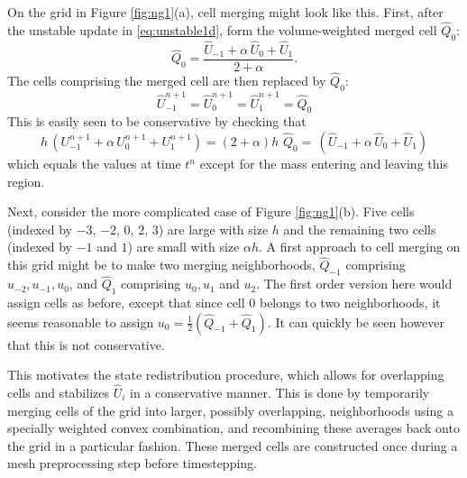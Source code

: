 On the grid in Figure \ref{fig:ng1}(a), cell merging might look like this.
First, after the unstable update in \eqref{eq:unstable1d}, form the 
volume-weighted merged cell $\widehat{Q}_0$:
\begin{equation}
\widehat{Q}_0 = \frac{\widehat{U}_{-1} + \alpha \,  \widehat{U}_0 + 
\widehat{U}_1}{2+\alpha} .
\end{equation}
The cells comprising the merged cell
are then replaced by $\widehat{Q}_0$:
\begin{equation}
\widehat{U}_{-1}^{n+1} = \widehat{U}_0^{n+1} = \widehat{U}_1^{n+1} =
\widehat{Q}_0
\end{equation}
This is easily seen to be conservative by checking that
\begin{equation}
h \, (U_{-1}^{n+1} + \alpha \, U_0^{n+1} + U_1^{n+1})
= (2+\alpha) h \,  \, \widehat{Q}_0 =
 \, (\widehat{U}_{-1} + \alpha \, \widehat{U}_{0} +  \widehat{U}_{1})
\end{equation}
which equals the values at time $t^n$  except for the mass entering and
leaving this region.


Next, consider the more complicated case of Figure \ref{fig:ng1}(b).
Five cells (indexed by $-3$, $-2$, $0$, $2$, $3$) are large 
with size $h$ and the remaining two cells (indexed by $-1$ and $1$) 
are small with size $\alpha h$.
A first approach to cell merging on this grid
might be to make two merging neighborhoods, $\widehat{Q}_{-1}$
comprising $u_{-2},u_{-1},u_0$, and $\widehat{Q}_1$ comprising $u_0, u_1$ 
and $u_2$.
The first order version here would assign cells as before, except that
since cell 0 belongs to two neighborhoods, it seems  reasonable
to assign $u_0 = \frac{1}{2} (\widehat{Q}_{-1} + \widehat{Q}_1).$  
It can quickly be  seen however
that this is not conservative. 

This motivates the state redistribution
procedure, which allows for overlapping cells and stabilizes 
$\widehat{U}_i$ in a conservative manner.
This is done by temporarily merging cells of the grid into 
larger, possibly overlapping, neighborhoods using a specially weighted 
convex combination, and recombining these averages back onto the
grid in a particular fashion.  These merged cells are 
constructed once during a mesh preprocessing step before timestepping.

